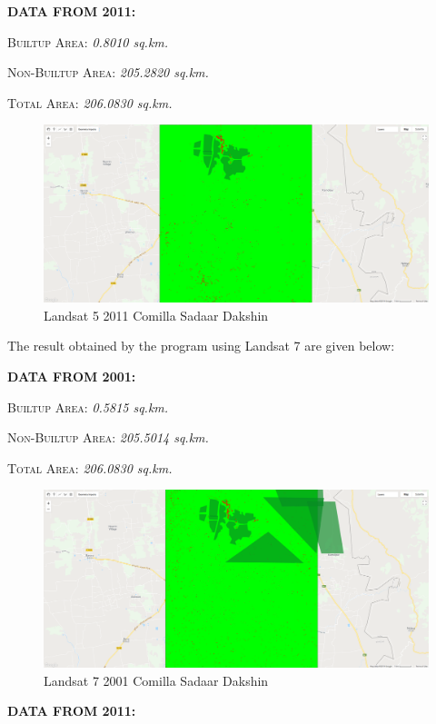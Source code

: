 \documentclass{article}
\begin{document}
\textbf{DATA FROM 2011:}

\textsc{Builtup Area: } \textit{0.8010 sq.km.}

\textsc{Non-Builtup Area: } \textit{205.2820 sq.km.}

\textsc{Total Area: } \textit{206.0830 sq.km.}

\begin{figure}[H]
\centering
\includegraphics[width=\textwidth]{2011_ComillaSadaarDakshin}
\caption{Landsat 5 2011 Comilla Sadaar Dakshin}
\end{figure}

\vfill

The result obtained by the program using \textsf{Landsat 7} are given below:

\textbf{DATA FROM 2001:}

\textsc{Builtup Area: } \textit{0.5815 sq.km.}

\textsc{Non-Builtup Area: } \textit{205.5014 sq.km.}

\textsc{Total Area: } \textit{206.0830 sq.km.}

\begin{figure}[H]
\centering
\includegraphics[width=\textwidth]{2001_ComillaSadaarDakshin_L7}
\caption{Landsat 7 2001 Comilla Sadaar Dakshin}
\end{figure}

\textbf{DATA FROM 2011:}
\end{document}
